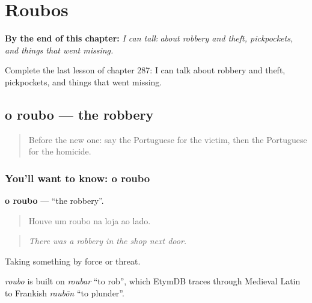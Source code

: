 
\chapter{Roubos}
\label{ch:pt-roubos}

\begin{chapteropening}
\textbf{By the end of this chapter:} \emph{I can talk about robbery and theft, pickpockets, and things that went missing.}

Complete the last lesson of chapter 287: I can talk about robbery and theft, pickpockets, and things that went missing.
\end{chapteropening}

\section[o roubo]{o roubo — the robbery}

\label{lesson:PT-C287-roubo}



\begin{quote}
Before the new one: say the Portuguese for the victim, then the Portuguese for the homicide.
\end{quote}

\subsection*{You'll want to know: o roubo}
\textbf{o roubo} — \textquotedblleft{}the robbery\textquotedblright{}.

\begin{quote}
Houve um roubo na loja ao lado.
\end{quote}

\begin{quote}
\emph{There was a robbery in the shop next door.}
\end{quote}

Taking something by force or threat.

\begin{cousinweb}
\emph{roubo} is built on \emph{roubar} \textquotedblleft{}to rob\textquotedblright{}, which EtymDB traces through Medieval Latin to Frankish \emph{raubōn} \textquotedblleft{}to plunder\textquotedblright{}.
\end{cousinweb}

